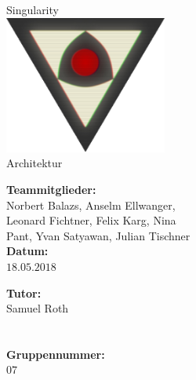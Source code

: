 \documentclass[12pt]{article}
\newcommand{\changefont}[4]{{\fontfamily{#1}\fontsize{#2}{#3}\selectfont #4}} %
\begin{document}
\renewcommand{\figurename}{Fig.}%
\renewcommand{\arraystretch}{1.4}%

\begin{titlepage}
    \begin{center}
        \changefont{pbk}{32}{35}{Singularity}\\\vspace{3em}
        \includegraphics[width=0.4\textwidth]{res/SingularityLogo2.png}\\\vspace{5em}
        \changefont{cmr}{32}{35}{Architektur}
    \end{center}
    \vspace{7em}

    \begin{minipage}[t]{.5\textwidth}
        \begin{center}
            \textbf{Teammitglieder:}\\
            \vspace{.5em}
            Norbert Balazs, Anselm Ellwanger,\\
            Leonard Fichtner, Felix Karg, Nina\\
            Pant, Yvan Satyawan, Julian Tischner\\
            \vspace{2em}
            \textbf{Datum:}\\
            \vspace{.5em}
            $18.05.2018$
        \end{center}
    \end{minipage}
    \begin{minipage}[t]{.5\textwidth}
        \begin{center}
            \textbf{Tutor:}\\
            \vspace{.5em}
            Samuel Roth\\
            \quad\\
            \quad\\
            \vspace{2em}
            \textbf{Gruppennummer:}\\
            \vspace{.5em}
            $07$
        \end{center}
    \end{minipage}
\end{titlepage}
\end{document}
